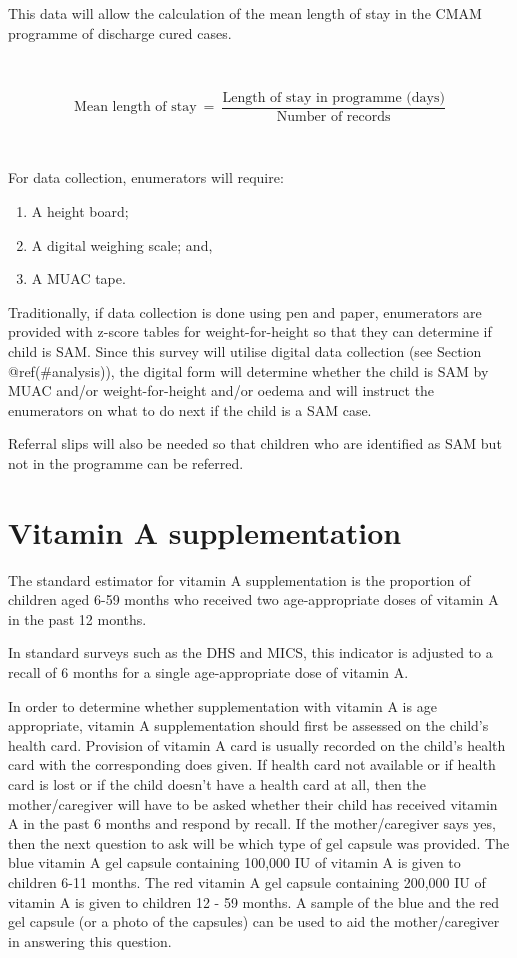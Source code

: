\documentclass[12pt,a4paper]{book}
\theoremstyle{definition}
\theoremstyle{definition}
\theoremstyle{definition}
\theoremstyle{remark}
\begin{document}
This data will allow the calculation of the mean length of stay in the
CMAM programme of discharge cured cases.

~

\[ \text{Mean length of stay} ~ = ~ \frac{\text{Length of stay in programme (days)}}{\text{Number of records}} \]

~

For data collection, enumerators will require:

\begin{enumerate}
\def\labelenumi{\arabic{enumi}.}
\item
  A height board;
\item
  A digital weighing scale; and,
\item
  A MUAC tape.
\end{enumerate}

Traditionally, if data collection is done using pen and paper,
enumerators are provided with z-score tables for weight-for-height so
that they can determine if child is SAM. Since this survey will utilise
digital data collection (see Section @ref(\#analysis)), the digital form
will determine whether the child is SAM by MUAC and/or weight-for-height
and/or oedema and will instruct the enumerators on what to do next if
the child is a SAM case.

Referral slips will also be needed so that children who are identified
as SAM but not in the programme can be referred.

\hypertarget{vitamin-a-supplementation}{%
\section{Vitamin A supplementation}\label{vitamin-a-supplementation}}

The standard estimator for vitamin A supplementation is the proportion
of children aged 6-59 months who received two age-appropriate doses of
vitamin A in the past 12 months.

In standard surveys such as the DHS and MICS, this indicator is adjusted
to a recall of 6 months for a single age-appropriate dose of vitamin A.

In order to determine whether supplementation with vitamin A is age
appropriate, vitamin A supplementation should first be assessed on the
child's health card. Provision of vitamin A card is usually recorded on
the child's health card with the corresponding does given. If health
card not available or if health card is lost or if the child doesn't
have a health card at all, then the mother/caregiver will have to be
asked whether their child has received vitamin A in the past 6 months
and respond by recall. If the mother/caregiver says yes, then the next
question to ask will be which type of gel capsule was provided. The blue
vitamin A gel capsule containing 100,000 IU of vitamin A is given to
children 6-11 months. The red vitamin A gel capsule containing 200,000
IU of vitamin A is given to children 12 - 59 months. A sample of the
blue and the red gel capsule (or a photo of the capsules) can be used to
aid the mother/caregiver in answering this question.
\end{document}
